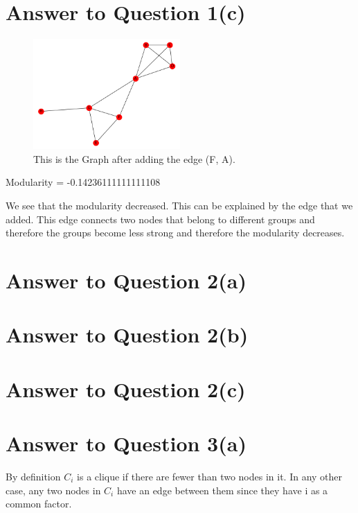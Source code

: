 \documentclass[11pt]{article}
\begin{document}
\section*{Answer to Question 1(c)}
\begin{figure}[h]
\caption{This is the Graph after adding the edge (F, A).}
\centering
\includegraphics[width=0.5\textwidth]{./figures/G_c}
\end{figure}
Modularity =  -0.14236111111111108

We see that the modularity decreased. This can be explained by the edge that we added. This edge connects two nodes that belong to different groups and therefore the groups become less strong and therefore the modularity decreases.


\section*{Answer to Question 2(a)}

\section*{Answer to Question 2(b)}

\section*{Answer to Question 2(c)}

\section*{Answer to Question 3(a)}
By definition $C_i$ is a clique if there are fewer than two nodes in it. 
In any other case, any two nodes in $C_i$ have an edge between them since they have i as a common factor.
\end{document}
